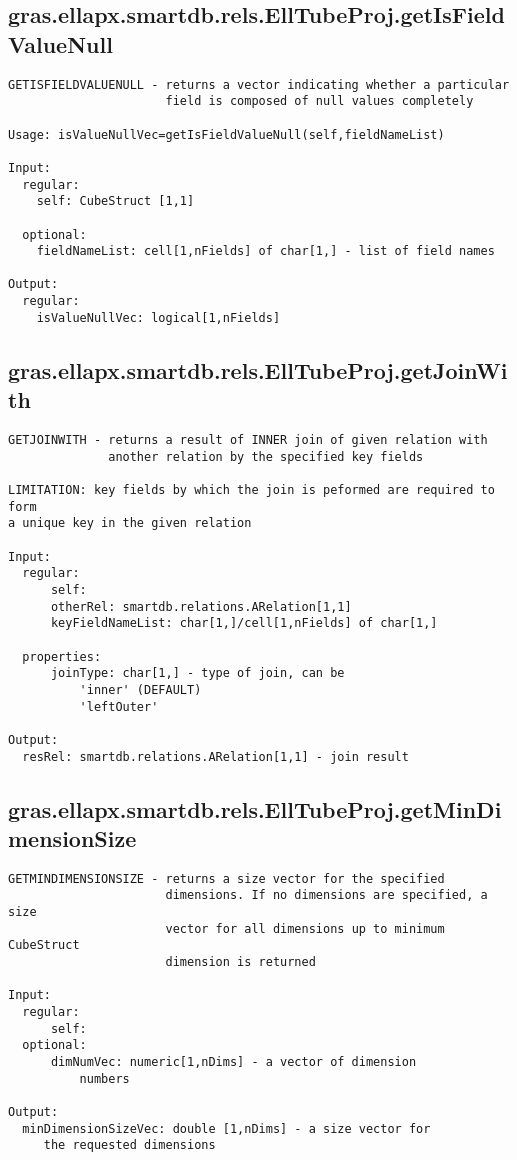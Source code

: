 \subsection{\texorpdfstring{gras.ellapx.smartdb.rels.EllTubeProj.getIsFieldValueNull}{getIsFieldValueNull}}\label{method:gras.ellapx.smartdb.rels.EllTubeProj.getIsFieldValueNull}
\begin{verbatim}
GETISFIELDVALUENULL - returns a vector indicating whether a particular
                      field is composed of null values completely

Usage: isValueNullVec=getIsFieldValueNull(self,fieldNameList)

Input:
  regular:
    self: CubeStruct [1,1]

  optional:
    fieldNameList: cell[1,nFields] of char[1,] - list of field names

Output:
  regular:
    isValueNullVec: logical[1,nFields]
\end{verbatim}
\subsection{\texorpdfstring{gras.ellapx.smartdb.rels.EllTubeProj.getJoinWith}{getJoinWith}}\label{method:gras.ellapx.smartdb.rels.EllTubeProj.getJoinWith}
\begin{verbatim}
GETJOINWITH - returns a result of INNER join of given relation with
              another relation by the specified key fields

LIMITATION: key fields by which the join is peformed are required to form
a unique key in the given relation

Input:
  regular:
      self:
      otherRel: smartdb.relations.ARelation[1,1]
      keyFieldNameList: char[1,]/cell[1,nFields] of char[1,]

  properties:
      joinType: char[1,] - type of join, can be
          'inner' (DEFAULT)
          'leftOuter'

Output:
  resRel: smartdb.relations.ARelation[1,1] - join result
\end{verbatim}
\subsection{\texorpdfstring{gras.ellapx.smartdb.rels.EllTubeProj.getMinDimensionSize}{getMinDimensionSize}}\label{method:gras.ellapx.smartdb.rels.EllTubeProj.getMinDimensionSize}
\begin{verbatim}
GETMINDIMENSIONSIZE - returns a size vector for the specified
                      dimensions. If no dimensions are specified, a size
                      vector for all dimensions up to minimum CubeStruct
                      dimension is returned

Input:
  regular:
      self:
  optional:
      dimNumVec: numeric[1,nDims] - a vector of dimension
          numbers

Output:
  minDimensionSizeVec: double [1,nDims] - a size vector for
     the requested dimensions
\end{verbatim}
